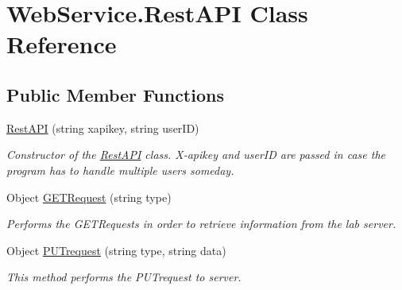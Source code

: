 \hypertarget{class_web_service_1_1_rest_a_p_i}{}\section{Web\+Service.\+Rest\+A\+P\+I Class Reference}
\label{class_web_service_1_1_rest_a_p_i}
\subsection*{Public Member Functions}
\begin{DoxyCompactItemize}
\item 
\hyperlink{class_web_service_1_1_rest_a_p_i_a08ee9f1802d2b4d484d50a3df76c8d02}{Rest\+A\+P\+I} (string xapikey, string user\+I\+D)
\begin{DoxyCompactList}\small\item\em Constructor of the \hyperlink{class_web_service_1_1_rest_a_p_i}{Rest\+A\+P\+I} class. X-\/apikey and user\+I\+D are passed in case the program has to handle multiple users someday. \end{DoxyCompactList}\item 
Object \hyperlink{class_web_service_1_1_rest_a_p_i_ac3a9fa141b05a8e48e8851bd32563480}{G\+E\+T\+Request} (string type)
\begin{DoxyCompactList}\small\item\em Performs the G\+E\+T\+Requests in order to retrieve information from the lab server. \end{DoxyCompactList}\item 
Object \hyperlink{class_web_service_1_1_rest_a_p_i_ac185fc074ba658fb76d76510193171c8}{P\+U\+Trequest} (string type, string data)
\begin{DoxyCompactList}\small\item\em This method performs the P\+U\+Trequest to server. \end{DoxyCompactList}\end{DoxyCompactItemize}
